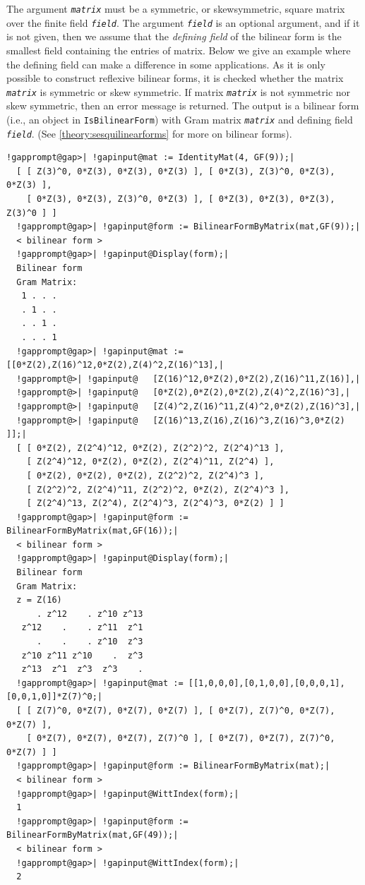 \documentclass[a4paper,11pt]{report}
\begin{document}
{{{ The argument \mbox{\texttt{\mdseries\slshape matrix}} must be a symmetric, or skew\texttt{}symmetric, square matrix over
the finite field \mbox{\texttt{\mdseries\slshape field}}. The argument \mbox{\texttt{\mdseries\slshape field}} is an optional argument, and if it is not given, then we assume that the \emph{defining field} of the bilinear form is the smallest field containing the entries of matrix.
Below we give an example where the defining field can make a difference in
some applications. As it is only possible to construct reflexive bilinear
forms, it is checked whether the matrix \mbox{\texttt{\mdseries\slshape matrix}} is symmetric or skew symmetric. If matrix \mbox{\texttt{\mdseries\slshape matrix}} is not symmetric nor skew symmetric, then an error message is returned. The
output is a bilinear form (i.e., an object in \texttt{IsBilinearForm}) with Gram matrix \mbox{\texttt{\mdseries\slshape matrix}} and defining field \mbox{\texttt{\mdseries\slshape field}}. (See \ref{theory:sesquilinearforms} for more on bilinear forms). 
\begin{Verbatim}[commandchars=!@|,fontsize=\small,frame=single,label=Example]
  !gapprompt@gap>| !gapinput@mat := IdentityMat(4, GF(9));|
  [ [ Z(3)^0, 0*Z(3), 0*Z(3), 0*Z(3) ], [ 0*Z(3), Z(3)^0, 0*Z(3), 0*Z(3) ], 
    [ 0*Z(3), 0*Z(3), Z(3)^0, 0*Z(3) ], [ 0*Z(3), 0*Z(3), 0*Z(3), Z(3)^0 ] ]
  !gapprompt@gap>| !gapinput@form := BilinearFormByMatrix(mat,GF(9));|
  < bilinear form >
  !gapprompt@gap>| !gapinput@Display(form);|
  Bilinear form
  Gram Matrix:
   1 . . .
   . 1 . .
   . . 1 .
   . . . 1
  !gapprompt@gap>| !gapinput@mat := [[0*Z(2),Z(16)^12,0*Z(2),Z(4)^2,Z(16)^13],|
  !gapprompt@>| !gapinput@   [Z(16)^12,0*Z(2),0*Z(2),Z(16)^11,Z(16)],|
  !gapprompt@>| !gapinput@   [0*Z(2),0*Z(2),0*Z(2),Z(4)^2,Z(16)^3],|
  !gapprompt@>| !gapinput@   [Z(4)^2,Z(16)^11,Z(4)^2,0*Z(2),Z(16)^3],|
  !gapprompt@>| !gapinput@   [Z(16)^13,Z(16),Z(16)^3,Z(16)^3,0*Z(2) ]];|
  [ [ 0*Z(2), Z(2^4)^12, 0*Z(2), Z(2^2)^2, Z(2^4)^13 ], 
    [ Z(2^4)^12, 0*Z(2), 0*Z(2), Z(2^4)^11, Z(2^4) ], 
    [ 0*Z(2), 0*Z(2), 0*Z(2), Z(2^2)^2, Z(2^4)^3 ], 
    [ Z(2^2)^2, Z(2^4)^11, Z(2^2)^2, 0*Z(2), Z(2^4)^3 ], 
    [ Z(2^4)^13, Z(2^4), Z(2^4)^3, Z(2^4)^3, 0*Z(2) ] ]
  !gapprompt@gap>| !gapinput@form := BilinearFormByMatrix(mat,GF(16));|
  < bilinear form >
  !gapprompt@gap>| !gapinput@Display(form);|
  Bilinear form
  Gram Matrix:
  z = Z(16)
      . z^12    . z^10 z^13
   z^12    .    . z^11  z^1
      .    .    . z^10  z^3
   z^10 z^11 z^10    .  z^3
   z^13  z^1  z^3  z^3    .
  !gapprompt@gap>| !gapinput@mat := [[1,0,0,0],[0,1,0,0],[0,0,0,1],[0,0,1,0]]*Z(7)^0;|
  [ [ Z(7)^0, 0*Z(7), 0*Z(7), 0*Z(7) ], [ 0*Z(7), Z(7)^0, 0*Z(7), 0*Z(7) ], 
    [ 0*Z(7), 0*Z(7), 0*Z(7), Z(7)^0 ], [ 0*Z(7), 0*Z(7), Z(7)^0, 0*Z(7) ] ]
  !gapprompt@gap>| !gapinput@form := BilinearFormByMatrix(mat);|
  < bilinear form >
  !gapprompt@gap>| !gapinput@WittIndex(form);|
  1
  !gapprompt@gap>| !gapinput@form := BilinearFormByMatrix(mat,GF(49));|
  < bilinear form >
  !gapprompt@gap>| !gapinput@WittIndex(form);|
  2
   

\end{Verbatim}}}}
\end{document}
